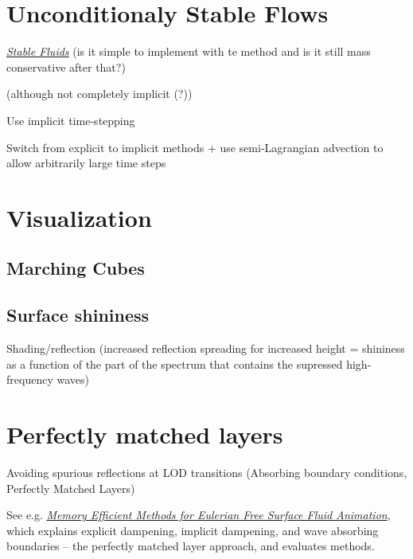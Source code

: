 \section{Unconditionaly Stable Flows}

\textit{\href{http://www.dgp.toronto.edu/people/stam/reality/Research/pdf/ns.pdf}{Stable Fluids}} (is it simple to implement with te \VOF method and is it still mass conservative after that?)

\SIMPLE (although not completely implicit (?))

Use implicit time-stepping

Switch from explicit to implicit methods + use semi-Lagrangian advection to allow arbitrarily large time steps

\section{Visualization}

\subsection{Marching Cubes}

\subsection{Surface shininess}

Shading/reflection (increased reflection spreading for increased height = shininess as a function of the part of the spectrum that contains the supressed high-frequency waves)



\section{Perfectly matched layers}

Avoiding spurious reflections at LOD transitions (Absorbing boundary conditions, Perfectly Matched Layers)

See e.g. \textit{\href{http://liu.diva-portal.org/smash/get/diva2:359805/FULLTEXT01}{Memory Efficient Methods for Eulerian Free Surface Fluid Animation}}, which explains explicit dampening, implicit dampening, and wave absorbing boundaries -- the perfectly matched layer approach, and evaluates methods.

